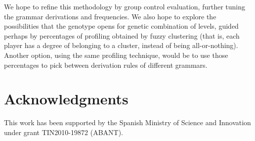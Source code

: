 \documentclass[conference]{IEEEtran}
\begin{document}
We hope to refine this methodology by group control evaluation, further tuning the grammar derivations and frequencies. We also hope to explore the possibilities that the genotype opens for genetic combination of levels, guided perhaps by percentages of profiling obtained by fuzzy clustering (that is, each player has a degree of belonging to a cluster, instead of being all-or-nothing). Another option, using the same profiling technique, would be to use those percentages to pick between derivation rules of different grammars.

\section*{Acknowledgments}
This work has been supported by the
Spanish Ministry of Science and Innovation under grant
TIN2010-19872 (ABANT).



%

%




\end{document}
